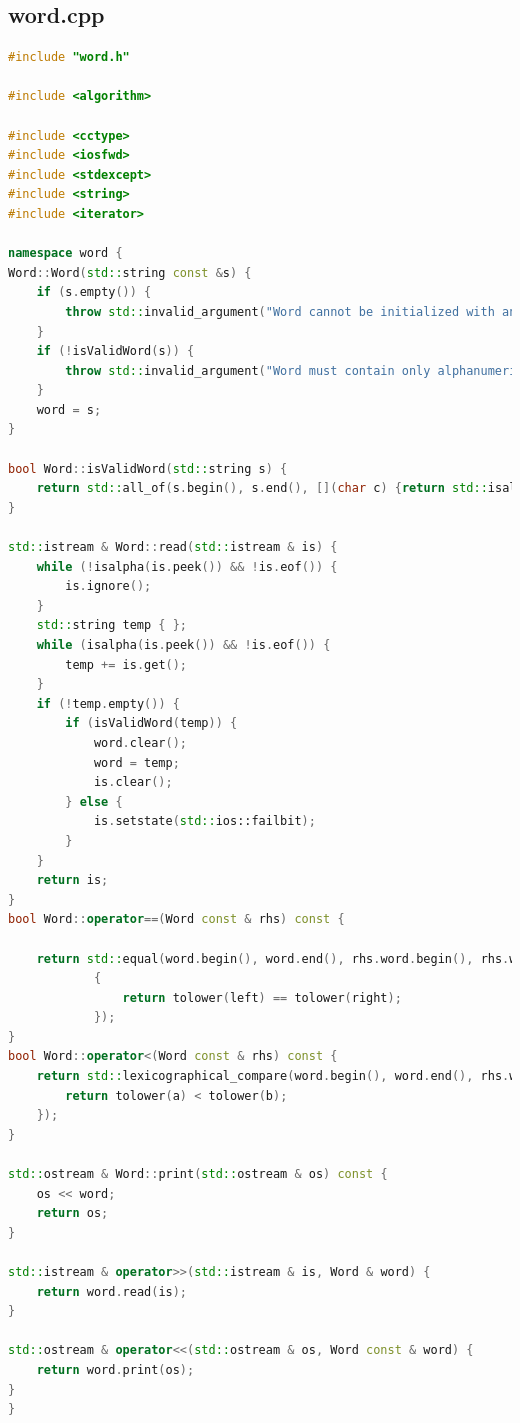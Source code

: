 \subsection{word.cpp}
\begin{lstlisting}[language=C++]
#include "word.h"

#include <algorithm>

#include <cctype>
#include <iosfwd>
#include <stdexcept>
#include <string>
#include <iterator>

namespace word {
Word::Word(std::string const &s) {
	if (s.empty()) {
		throw std::invalid_argument("Word cannot be initialized with an empty string!");
	}
	if (!isValidWord(s)) {
		throw std::invalid_argument("Word must contain only alphanumeric chars!");
	}
	word = s;
}

bool Word::isValidWord(std::string s) {
	return std::all_of(s.begin(), s.end(), [](char c) {return std::isalpha(c);});
}

std::istream & Word::read(std::istream & is) {
	while (!isalpha(is.peek()) && !is.eof()) {
		is.ignore();
	}
	std::string temp { };
	while (isalpha(is.peek()) && !is.eof()) {
		temp += is.get();
	}
	if (!temp.empty()) {
		if (isValidWord(temp)) {
			word.clear();
			word = temp;
			is.clear();
		} else {
			is.setstate(std::ios::failbit);
		}
	}
	return is;
}
bool Word::operator==(Word const & rhs) const {

	return std::equal(word.begin(), word.end(), rhs.word.begin(), rhs.word.end(), [](auto left, auto right)
			{
				return tolower(left) == tolower(right);
			});
}
bool Word::operator<(Word const & rhs) const {
	return std::lexicographical_compare(word.begin(), word.end(), rhs.word.begin(), rhs.word.end(), [](char a, char b) {
		return tolower(a) < tolower(b);
	});
}

std::ostream & Word::print(std::ostream & os) const {
	os << word;
	return os;
}

std::istream & operator>>(std::istream & is, Word & word) {
	return word.read(is);
}

std::ostream & operator<<(std::ostream & os, Word const & word) {
	return word.print(os);
}
}
\end{lstlisting}
